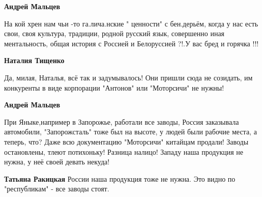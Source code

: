 \begin{itemize}
\begin{itemize}
 
\textbf{Андрей Мальцев} 

На кой хрен нам чьи -то га.лича.нские " ценности" с бен.дерьём, когда у нас
есть свои, своя культура, традиции, родной русский язык, совершенно иная
ментальность, общая история с Россией и Белоруссией ?!.У вас бред и горячка !!!


 
\textbf{Наталия Тищенко} 

Да, милая, Наталья, всё так и задумывалось! Они пришли сюда не созидать, им
конкуренты в виде корпорации "Антонов" или "Моторсичи" не нужны!


 
\textbf{Андрей Мальцев} 

При Яныке,например в Запорожье, работали все заводы, Россия заказывала
автомобили, "Запорожсталь" тоже был на высоте, у людей были рабочие места, а
теперь, что? Даже всю документацию "Моторсичи" китайцам продали! Заводы
остановлены, тлеют потихоньку! Разница налицо! Западу наша продукция не нужна, у
неё своей девать некуда!


 
\textbf{Татьяна Ракицкая} России наша продукция тоже не нужна. Это видно по "республикам" - все заводы стоят.

 

\end{itemize}
\end{itemize}
